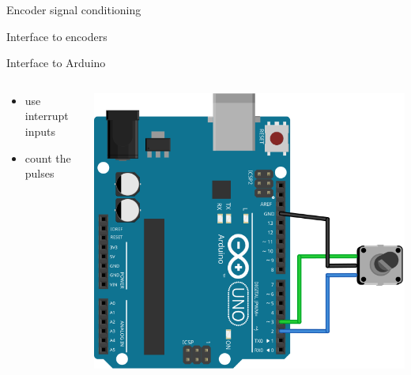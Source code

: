 \documentclass[compress]{beamer}
\begin{document}

{
    \begin{frame}{Encoder signal conditioning}
    \end{frame}
}

{
    \begin{frame}{Interface to encoders}
    \end{frame}
}

    \begin{frame}{Interface to Arduino}
        \begin{columns}
            \begin{column}{0.5\linewidth}
                \begin{itemize}
                    \item use interrupt inputs
                    \item count the pulses
                \end{itemize}
            \end{column}
            \begin{column}{0.5\linewidth}
                \begin{center}
                    \includegraphics[width=\linewidth]{arduino-encoder}
                \end{center}
            \end{column}
        \end{columns}
    \end{frame}
\end{document}
